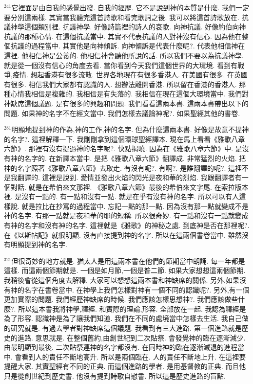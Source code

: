 \documentclass{book}
\begin{document}
$^{241}$它裡面是由自我的感覺出發.
自我的經歷.
它不是說到神的本質是什麼.
我們一定要分別這兩樣.
其實當我聽完這首詩歌和看完歌詞之後.
我可以將這首詩歌放在.
抗議神學這個類別裡.
抗議神學.
好像詩篇裡的詩人的哀歌.
向神抗議.
好像約伯向神抗議的那種心情.
在這個抗議當中.
其實不代表抗議的人對神沒有信心.
因為他在整個抗議的過程當中.
其實他是向神傾訴.
向神傾訴是代表什麼呢?.
代表他相信神在這裡.
他相信神是公義的.
他相信神會聽他所說的話.
所以我們不要以為抗議神學.
就是從一個沒有信心的角度去看.
當你看到今天我們這個世界的大環境.
看到有戰爭,疫情.
想起香港有很多流散.
世界各地現在有很多香港人.
在美國有很多.
在英國有很多.
相信我們大家都有認識的人.
想辦法離開香港.
所以留在香港的香港人.
那種心情我相信是複雜的.
我相信是有失落的.
我相信在現在這個大環境當中.
我們對神缺席這個議題.
是有很多的興趣和問題.
我們看看這兩本書.
這兩本書帶出以下的問題.
如果神的名字不在經文當中.
我們怎樣去議論神呢?.
如果聖經其他的書卷.

$^{281}$明顯地提到神的作為,神的工作,神的名字.
但為什麼這兩本書.
好像是故意不提神的名字?.
這裡解釋一下.
我剛剛拿到這個環球聖經譯本.
現在馬上看看《雅歌八章六節》.
那裡有沒有提過神的名字呢?.
快點揭曉.
因為在《雅歌八章六節》中.
是沒有神的名字的.
在新譯本當中.
是把《雅歌八章六節》翻譯成.
非常猛烈的火焰.
把神的名字照著《雅歌八章六節》去取走.
有沒有呢?.
有啊?.
是誰翻譯的呢?.
這裡不是我翻譯的.
這裡是說到.
愛情並發出火焰的閃光是夜和華的烈焰.
我跟翻譯者有一個對話.
就是在希伯來文那裡.
《雅歌八章六節》最後的希伯來文字尾.
在索拉版本裡.
是沒有一點的.
有一點和沒有一點.
就是在乎有沒有神的名字.
所以可以有人這樣說.
就是拉比在抄寫的過程當中.
忘記一點的那一點.
因為沒有那一點就變成不是神的名字.
有那一點就是夜和華的耶的短稱.
所以很奇妙.
有一點和沒有一點就變成有神的名字和沒有神的名字.
這裡就是《雅歌》的神秘之處.
到底神是否在那裡呢?.
在《以斯帖記》就很明顯.
沒有直接提到神的名字.
所以在這兩個書卷當中.
雖然沒有明顯提到神的名字.

$^{321}$但很奇妙的地方就是.
猶太人是用這兩本書在他們的節期當中朗誦.
每一年都是這樣.
而這兩個節期就是.
一個是如月節,一個是普二節.
如果大家想想這兩個節期.
我稍後會從這個角度去解釋.
大家可以想想這兩本書和神缺席的關係.
另外,如果沒有神的名字在書卷當中.
在神學上我們怎樣對神有一個不同的認識呢?.
另外,有一個更加實際的問題.
我們經歷神缺席的時候.
我們應該怎樣思想神?.
我們應該做些什麼?.
所以這本書我將神學,釋經.
和實際的理論,形容.
全部放在一起.
我認為釋經是為了形容.
認識神是為了讓我們知道.
我們在不同的處境當中怎樣去生活.
我自己做的研究就是.
有過去學者對神缺席這個議題.
我看到有三大進路.
第一個進路就是歷史的進路.
意思就是.
在整個舊約,由創世紀到二次貼祭.
會發覺神的臨在逐漸減少.
由最明顯到最後.
二次貼祭連神的名字都沒有.
在同時神的臨在逐漸減退的進程當中.
會看到人的責任不斷地高升.
所以是兩個臨在.
人的責任不斷地上升.
在這裡要提醒大家.
其實聖經有不同的正典.
而這個進路的學者.
是用基督教的正典.
而且他只是從創世紀到歷史書.
他沒有提到詩歌自慰書.
所以這是歷史進路的盲點.
\end{document}
